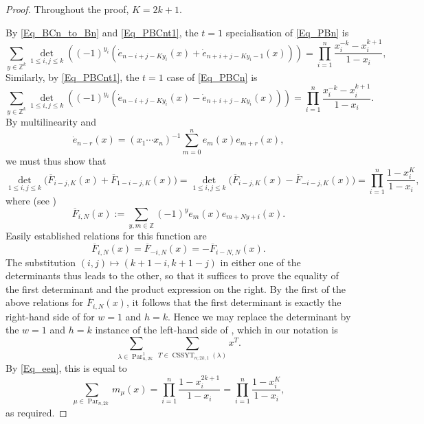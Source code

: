 \documentclass[pdftex]{sigma}
\numberwithin{equation}{section}
\renewcommand{\leq}{\leqslant}
\DeclareMathOperator{\Par}{Par}
\DeclareMathOperator{\CSSYT}{CSSYT}
\newcommand{\la}{\lambda}
\begin{document}
\begin{proof}
Throughout the proof, $K=2k+1$.

By \eqref{Eq_BCn_to_Bn} and \eqref{Eq_PBCnt1}, the $t=1$ specialisation
of \eqref{Eq_PBn} is
\[
\sum_{y\in\mathbb{Z}^k}\det_{1\leq i,j\leq k}((-1)^{y_i}
(\dot{e}_{n-i+j-Ky_i}(x)+\dot{e}_{n+i+j-Ky_i-1}(x)))
=\prod_{i=1}^n \frac{x_i^{-k}-x_i^{k+1}}{1-x_i},
\]
Similarly, by \eqref{Eq_PBCnt1}, the $t=1$ case of \eqref{Eq_PBCn} is
\[
\sum_{y\in\mathbb{Z}^k} \det_{1\leq i,j\leq k}((-1)^{y_i}
(\dot{e}_{n-i+j-Ky_i}(x)-\dot{e}_{n+i+j-Ky_i}(x)))
=\prod_{i=1}^n \frac{x_i^{-k}-x_i^{k+1}}{1-x_i}.
\]
By multilinearity and
\begin{equation*}%
\dot{e}_{n-r}(x)=(x_1\cdots x_n)^{-1} \sum_{m=0}^n e_m(x) e_{m+r}(x),
\end{equation*}
we must thus show that
\[
\det_{1\leq i,j\leq k}
\bigl(\overline{F}_{i-j,K}(x)+\overline{F}_{1-i-j,K}(x)\bigr)=
\det_{1\leq i,j\leq k}
\bigl(\overline{F}_{i-j,K}(x)-\overline{F}_{-i-j,K}(x)\bigr)=
\prod_{i=1}^n \frac{1-x_i^K}{1-x_i},
\]
where (see \cite[Theorem 3.1]{HKKO25})
\[
\overline{F}_{i,N}(x):=\sum_{y,m\in\mathbb{Z}} (-1)^y e_m(x)e_{m+Ny+i}(x).
\]
Easily established relations for this function are
\[
\overline{F}_{i,N}(x)=\overline{F}_{-i,N}(x)=-\overline{F}_{i-N,N}(x).
\]
The substitution $(i,j)\mapsto (k+1-i,k+1-j)$ in either one of
the determinants thus leads to the other, so that it suffices
to prove the equality of the first determinant and the product
expression on the right.
%
By the first of the above relations for $\overline{F}_{i,N}(x)$, it
follows that the first determinant is exactly the right-hand side
of \cite[equation~(3.2)]{HKKO25} for $w=1$ and $h=k$.
Hence we may replace the determinant by the $w=1$ and $h=k$ instance
of the left-hand side of \cite[equation~(3.2)]{HKKO25}, which in our
notation is
\[
\sum_{\la\in\Par_{n,2k}^1} \sum_{T\in\CSSYT_{n;2k,1}(\la)} x^T.
\]
By \eqref{Eq_een}, this is equal to
\[
\sum_{\mu\in\Par_{n,2k}} m_{\mu}(x)=
\prod_{i=1}^n \frac{1-x_i^{2k+1}}{1-x_i}
=\prod_{i=1}^n \frac{1-x_i^K}{1-x_i},
\]
as required.
\end{proof}
\end{document}
